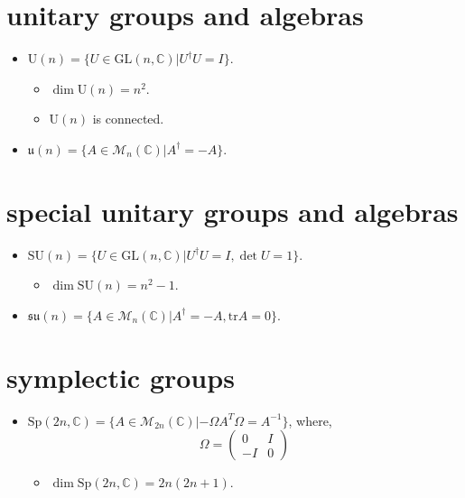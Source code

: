 \section{unitary groups and algebras}
\begin{itemize}
	\item $\mathrm{U}(n) = \{U \in \mathrm{GL}(n, \mathbb{C}) | U^\dag U = I\}$.
	\begin{itemize}
		\item $\dim \mathrm{U}(n) = n^2$.
		
		\item $\mathrm{U}(n)$ is connected.
	\end{itemize}
	
	\item $\mathfrak{u}(n) = \{A \in \mathcal{M}_n(\mathbb{C}) | A^\dag = - A\}$.
\end{itemize}

\section{special unitary groups and algebras}
\begin{itemize}
	\item $\mathrm{SU}(n) = \{U \in \mathrm{GL}(n, \mathbb{C}) | U^\dag U = I, \det U = 1\}$.
	\begin{itemize}
		\item $\dim \mathrm{SU}(n) = n^2 - 1$.
	\end{itemize}
	
	\item $\mathfrak{su}(n) = \{A \in \mathcal{M}_n(\mathbb{C}) | A^\dag = - A, \mathrm{tr} A = 0\}$.
\end{itemize}

\section{symplectic groups}
\begin{itemize}
	\item $\mathrm{Sp}(2 n, \mathbb{C}) = \{A \in \mathcal{M}_{2 n}(\mathbb{C}) | - \Omega A^T \Omega = A^{- 1}\}$, where,
	\begin{equation}
		\Omega = \begin{pmatrix}
			0 & I \\
			- I & 0
		\end{pmatrix}
	\end{equation}
	\begin{itemize}
		\item $\dim \mathrm{Sp}(2 n, \mathbb{C}) = 2 n (2 n + 1)$.
	\end{itemize}
\end{itemize}

